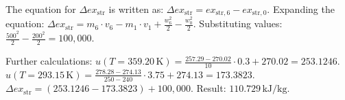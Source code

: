 The equation for \( \Delta ex_{\text{str}} \) is written as:  
\( \Delta ex_{\text{str}} = ex_{\text{str},6} - ex_{\text{str},0} \).  
Expanding the equation:  
\( \Delta ex_{\text{str}} = m_6 \cdot v_6 - m_1 \cdot v_1 + \frac{w_6^2}{2} - \frac{w_0^2}{2} \).  
Substituting values:  
\( \frac{500^2}{2} - \frac{200^2}{2} = 100,000 \).  

Further calculations:  
\( u(T = 359.20 \, \text{K}) = \frac{257.29 - 270.02}{10} \cdot 0.3 + 270.02 = 253.1246 \).  
\( u(T = 293.15 \, \text{K}) = \frac{278.28 - 274.13}{250 - 240} \cdot 3.75 + 274.13 = 173.3823 \).  
\( \Delta ex_{\text{str}} = (253.1246 - 173.3823) + 100,000 \).  
Result: \( 110.729 \, \text{kJ/kg} \).